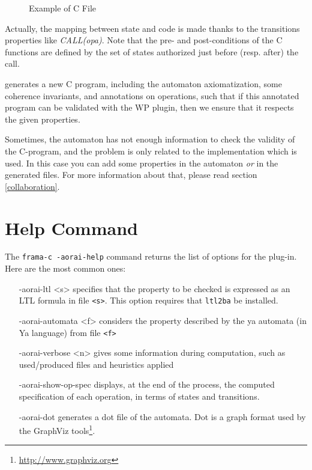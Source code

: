 \documentclass{report}
\begin{document}
\begin{figure}[ht]

\caption{Example of C File}
\label{example_c_file}
\end{figure}

Actually, the mapping between state and code is made thanks to the
transitions properties like \emph{CALL(opa)}. Note that
the pre- and post-conditions of the C functions are defined by the set
of states authorized just before (resp. after) the call.

\aorai generates a new C program, including the automaton
axiomatization, some coherence invariants, and annotations on
operations, such that if this annotated program can be validated with
the WP plugin, then we ensure that it respects the given
properties.

Sometimes, the automaton has not enough information to check the
validity of the C-program, and the problem is only related to the
implementation which is used. In this case you can add some properties
in the automaton \emph{or} in the generated files. For more
information about that, please read section \ref{collaboration}.

\section{Help Command}\label{sec:help-command}

 The \texttt{frama-c -aorai-help} command returns the list of options for the
 \aorai plug-in. Here are the most common ones:
 \begin{itemize}
   \item[-aorai-ltl <s>] specifies that the property to be checked
     is expressed as an LTL formula in file \texttt{<s>}. This option requires
     that \texttt{ltl2ba} be installed.
   \item[-aorai-automata <f>] considers the property described by the ya
     automata (in Ya language) from file \texttt{<f>}
   \item[-aorai-verbose <n>] gives some information during computation,
     such as used/produced files and heuristics applied
   \item[-aorai-show-op-spec] displays, at the end of the process, the computed specification of each operation, in terms of states and transitions.
   \item[-aorai-dot] generates a dot file of the automata.
     Dot is a graph format used by the
     GraphViz tools\footnote{\url{http://www.graphviz.org}}.
     
 \end{itemize}
\end{document}
